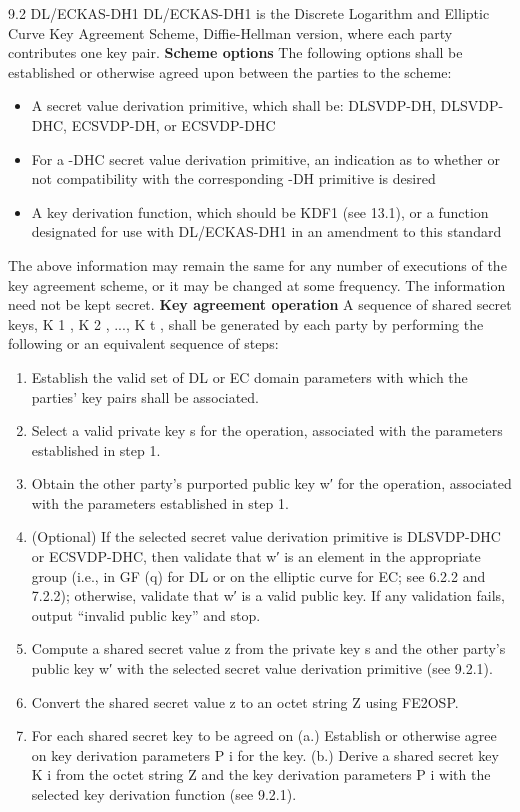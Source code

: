 9.2 DL/ECKAS-DH1
DL/ECKAS-DH1 is the Discrete Logarithm and Elliptic Curve Key Agreement Scheme, Diffie-Hellman
version, where each party contributes one key pair.
\textbf{Scheme options}
The following options shall be established or otherwise agreed upon between the parties to the scheme:
\begin{itemize}
  \item A secret value derivation primitive, which shall be: DLSVDP-DH, DLSVDP-DHC, ECSVDP-DH, or ECSVDP-DHC
  \item For a -DHC secret value derivation primitive, an indication as to whether or not compatibility with the corresponding -DH primitive is desired
  \item A key derivation function, which should be KDF1 (see 13.1), or a function designated for use with DL/ECKAS-DH1 in an amendment to this standard
\end{itemize}
The above information may remain the same for any number of executions of the key agreement scheme, or
it may be changed at some frequency. The information need not be kept secret.
\textbf{Key agreement operation}
A sequence of shared secret keys, K 1 , K 2 , ..., K t , shall be generated by each party by performing the
following or an equivalent sequence of steps:
\begin{enumerate}
  \item Establish the valid set of DL or EC domain parameters with which the parties’ key pairs shall be associated.
  \item Select a valid private key s for the operation, associated with the parameters established in step 1.
  \item Obtain the other party’s purported public key w′ for the operation, associated with the parameters established in step 1.
  \item (Optional) If the selected secret value derivation primitive is DLSVDP-DHC or ECSVDP-DHC, then validate that w′ is an element in the appropriate group (i.e., in GF (q) for DL or on the elliptic curve for EC; see 6.2.2 and 7.2.2); otherwise, validate that w′ is a valid public key. If any validation fails, output “invalid public key” and stop.
  \item Compute a shared secret value z from the private key s and the other party’s public key w′ with the selected secret value derivation primitive (see 9.2.1).
  \item Convert the shared secret value z to an octet string Z using FE2OSP.
  \item For each shared secret key to be agreed on (a.) Establish or otherwise agree on key derivation parameters P i for the key.
 (b.) Derive a shared secret key K i from the octet string Z and the key derivation parameters P i with the selected key derivation function (see 9.2.1).
\end{enumerate}

